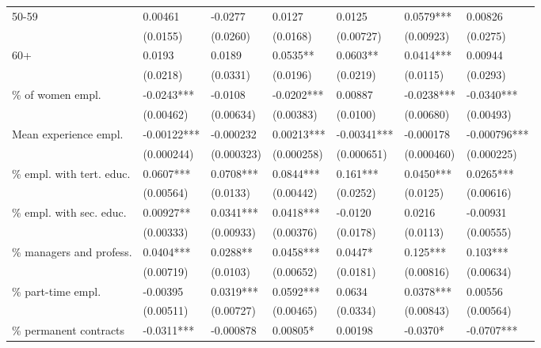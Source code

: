 {\begin{tabular}{lllllll}
50-59                            & 0.00461     & -0.0277    & 0.0127     & 0.0125      & 0.0579***  & 0.00826      \\
                                 & (0.0155)    & (0.0260)   & (0.0168)   & (0.00727)   & (0.00923)  & (0.0275)     \\
60+                              & 0.0193      & 0.0189     & 0.0535**   & 0.0603**    & 0.0414***  & 0.00944      \\
                                 & (0.0218)    & (0.0331)   & (0.0196)   & (0.0219)    & (0.0115)   & (0.0293)     \\
\% of women empl.                & -0.0243***  & -0.0108    & -0.0202*** & 0.00887     & -0.0238*** & -0.0340***   \\
                                 & (0.00462)   & (0.00634)  & (0.00383)  & (0.0100)    & (0.00680)  & (0.00493)    \\
Mean experience empl.            & -0.00122*** & -0.000232  & 0.00213*** & -0.00341*** & -0.000178  & -0.000796*** \\
                                 & (0.000244)  & (0.000323) & (0.000258) & (0.000651)  & (0.000460) & (0.000225)   \\
\% empl. with tert. educ.        & 0.0607***   & 0.0708***  & 0.0844***  & 0.161***    & 0.0450***  & 0.0265***    \\
                                 & (0.00564)   & (0.0133)   & (0.00442)  & (0.0252)    & (0.0125)   & (0.00616)    \\
\% empl. with sec. educ.         & 0.00927**   & 0.0341***  & 0.0418***  & -0.0120     & 0.0216     & -0.00931     \\
                                 & (0.00333)   & (0.00933)  & (0.00376)  & (0.0178)    & (0.0113)   & (0.00555)    \\
\% managers and profess.         & 0.0404***   & 0.0288**   & 0.0458***  & 0.0447*     & 0.125***   & 0.103***     \\
                                 & (0.00719)   & (0.0103)   & (0.00652)  & (0.0181)    & (0.00816)  & (0.00634)    \\
\% part-time empl.               & -0.00395    & 0.0319***  & 0.0592***  & 0.0634      & 0.0378***  & 0.00556      \\
                                 & (0.00511)   & (0.00727)  & (0.00465)  & (0.0334)    & (0.00843)  & (0.00564)    \\
\% permanent contracts           & -0.0311***  & -0.000878  & 0.00805*   & 0.00198     & -0.0370*   & -0.0707***   \\

\end{tabular}}
